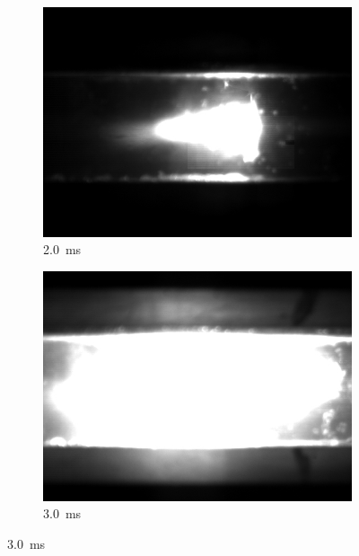             \begin{figure}[h]
                \centering
                \begin{subfigure}[t]{0.32\textwidth}
                    \centering
                    \includegraphics[width=\textwidth]{assets/3 design/LSP1_frames/20.jpg}
                    \caption{2.0~ms}
                    \label{fig:lsp1_20}
                \end{subfigure}
                \hfill
                \begin{subfigure}[t]{0.32\textwidth}
                    \centering
                    \includegraphics[width=\textwidth]{assets/3 design/LSP1_frames/30.jpg}
                    \caption{3.0~ms}
                    \label{fig:lsp1_30}

\end{subfigure}
\end{figure}
